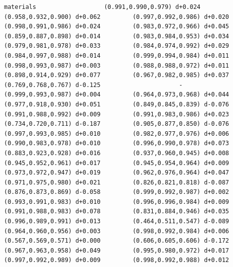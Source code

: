 \documentclass[11pt, letterpaper, openany]{book}
\begin{document}
\begin{empiricalbox}
\begin{lstlisting}[style=terminal]
materials                   (0.991,0.990,0.979) d+0.024         (0.958,0.932,0.900) d+0.062         (0.997,0.992,0.986) d+0.020         (0.998,0.991,0.986) d+0.024         (0.983,0.972,0.966) d+0.045         (0.859,0.887,0.898) d+0.014         (0.983,0.984,0.953) d+0.034         (0.979,0.981,0.978) d+0.033         (0.984,0.974,0.992) d+0.029         (0.984,0.997,0.988) d+0.014         (0.999,0.994,0.984) d+0.011         (0.998,0.993,0.987) d+0.003         (0.988,0.988,0.972) d+0.011         (0.898,0.914,0.929) d+0.077         (0.967,0.982,0.985) d+0.037         (0.769,0.768,0.767) d-0.125                      -                      (0.999,0.993,0.987) d+0.004         (0.964,0.973,0.968) d+0.044         (0.977,0.918,0.930) d+0.051         (0.849,0.845,0.839) d-0.076         (0.991,0.988,0.992) d+0.009         (0.991,0.983,0.986) d+0.023         (0.734,0.720,0.711) d-0.187         (0.905,0.877,0.850) d-0.076         (0.997,0.993,0.985) d+0.010         (0.982,0.977,0.976) d+0.006         (0.990,0.983,0.978) d+0.010         (0.996,0.990,0.978) d+0.073         (0.883,0.923,0.928) d+0.016         (0.937,0.960,0.945) d+0.008         (0.945,0.952,0.961) d+0.017         (0.945,0.954,0.964) d+0.009         (0.973,0.972,0.947) d+0.019         (0.962,0.976,0.964) d+0.047         (0.971,0.975,0.980) d+0.021         (0.826,0.821,0.818) d-0.087         (0.876,0.873,0.869) d-0.058         (0.999,0.992,0.987) d+0.002         (0.993,0.991,0.983) d+0.010         (0.996,0.996,0.984) d+0.009         (0.991,0.988,0.983) d+0.078         (0.831,0.884,0.946) d+0.035         (0.996,0.989,0.991) d+0.013         (0.464,0.511,0.547) d-0.089         (0.964,0.960,0.956) d+0.003         (0.998,0.992,0.984) d+0.006         (0.567,0.569,0.571) d+0.000         (0.606,0.605,0.606) d-0.172         (0.967,0.963,0.958) d+0.049         (0.995,0.980,0.972) d+0.017         (0.997,0.992,0.989) d+0.009         (0.998,0.992,0.988) d+0.012     

\end{lstlisting}
\end{empiricalbox}
\end{document}
